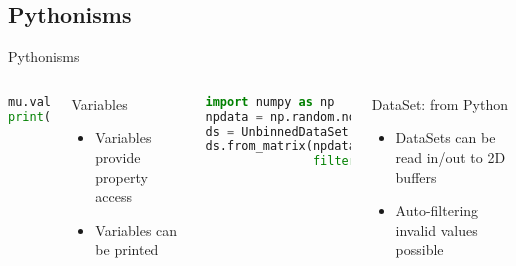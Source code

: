 \documentclass[aspectratio=169, smaller]{beamer}
\begin{document}
\subsection{Pythonisms}
\begin{frame}[fragile]{Pythonisms}
    \begin{columns}[c]
        \begin{lstlisting}[language=Python]
mu.value = 2
print(mu)
        \end{lstlisting}
        \begin{block}{Variables}
            \begin{itemize}
                \item Variables provide property access
                \item Variables can be printed
            \end{itemize}
        \end{block}
        \begin{lstlisting}[language=Python]
import numpy as np 
npdata = np.random.normal(1, 2.5, 100000)
ds = UnbinnedDataSet(xvar)
ds.from_matrix(npdata[:,np.newaxis],
               filter=True)
        \end{lstlisting}
        \begin{block}{DataSet: from Python}
            \begin{itemize}
                \item DataSets can be read in/out to 2D buffers
                \item Auto-filtering invalid values possible
            \end{itemize}
        \end{block}

    \end{columns}
\end{frame}
\end{document}
